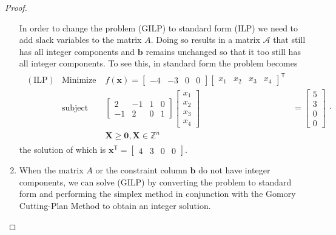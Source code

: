 \documentclass[12pt]{article}
\theoremstyle{definition}
\newcommand{\vc}[1]{\boldsymbol{#1}}
\newcommand{\tran}{\mathsf{T}}
\begin{document}
\begin{proof}
\begin{enumerate}
      In order to change the problem (GILP) to standard form (ILP) we need to add slack variables to the matrix $A$. Doing so
      results in a matrix $\mathscr{A}$ that still has all integer components and $\vc{b}$ remains unchanged so that it too
      still has all integer components. To see this, in standard form the problem becomes
      \begin{align*}
        \begin{array}{rlrl}
          (\text{ILP}) & \text{Minimize} & f(\vc{x}) = \begin{bmatrix}-4 & -3 & 0 & 0\end{bmatrix}\begin{bmatrix}x_1 & x_2 & x_3 & x_4\end{bmatrix}^\tran& \\
          & \text{subject to} & \begin{bmatrix}2 & -1 & 1 & 0\\ -1 & 2 & 0 & 1\end{bmatrix}\begin{bmatrix}x_1\\x_2\\x_3\\x_4\end{bmatrix} &= \begin{bmatrix}5\\3\\0\\0\end{bmatrix} \\
          & & \vc{X}\geq \vc{0}, \vc{X}\in\mathbb{Z}^n
        \end{array}.
      \end{align*}
      the solution of which is $\vc{x}^\tran = \begin{bmatrix}4 & 3 & 0 & 0\end{bmatrix}$.
    \item When the matrix $A$ or the constraint column $\vc{b}$ do not have integer components, we can solve (GILP) by converting the problem to
      standard form and performing the simplex method in conjunction with the Gomory Cutting-Plan Method to obtain an integer solution.
  \end{enumerate}
\end{proof}
\newpage
\end{document}

